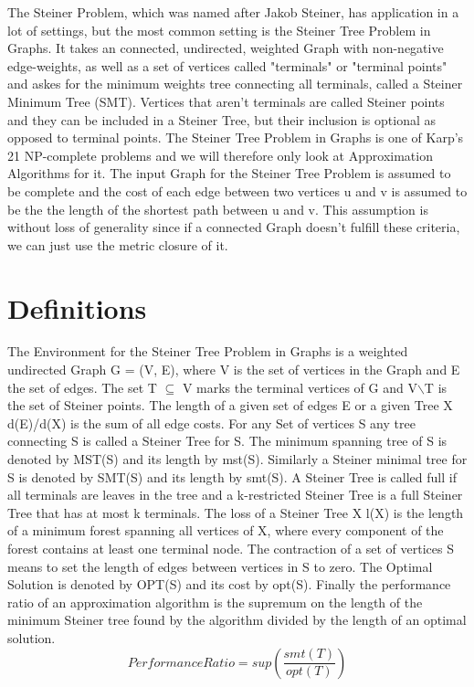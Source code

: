 The Steiner Problem, which was named after Jakob Steiner, has application in a lot of settings, but the most common setting is the Steiner Tree Problem in Graphs. It takes an connected, undirected, weighted Graph with non-negative edge-weights, as well as a set of vertices called "terminals" or "terminal points" and askes for the minimum weights tree connecting all terminals, called a Steiner Minimum Tree (SMT). Vertices that aren't terminals are called Steiner points and they can be included in a Steiner Tree, but their inclusion is optional as opposed to terminal points. The Steiner Tree Problem in Graphs is one of Karp's 21 NP-complete problems \cite{karp1972reducibility} and we will therefore only look at Approximation Algorithms for it. The input Graph for the Steiner Tree Problem is assumed to be complete and the cost of each edge between two vertices u and v is assumed to be the the length of the shortest path between u and v. This assumption is without loss of generality since if a connected Graph doesn't fulfill these criteria, we can just use the metric closure of it.

\section{Definitions}
The Environment for the Steiner Tree Problem in Graphs is a weighted undirected Graph G = (V, E), where V is the set of vertices in the Graph and E the set of edges. The set T $ \subseteq$ V marks the terminal vertices of G and V$\backslash$T is the set of Steiner points. The length of a given set of edges E or a given Tree X d(E)/d(X) is the sum of all edge costs. For any Set of vertices S any tree connecting S is called a Steiner Tree for S. The minimum spanning tree of S is denoted by MST(S) and its length by mst(S). Similarly a Steiner minimal tree for S is denoted by SMT(S) and its length by smt(S). A Steiner Tree is called full if all terminals are leaves in the tree and a k-restricted Steiner Tree is a full Steiner Tree that has at most k terminals. The loss of a Steiner Tree X l(X) is the length of a minimum forest spanning all vertices of X, where every component of the forest contains at least one terminal node. The contraction of a set of vertices S means to set the length of edges between vertices in S to zero. The Optimal Solution is denoted by OPT(S) and its cost by opt(S). Finally the performance ratio of an approximation algorithm is the supremum on the length of the minimum Steiner tree found by the algorithm divided by the length of an optimal solution.
\begin{equation} 
  Performance Ratio=sup(\frac{smt(T)}{opt(T)})
\end{equation}


